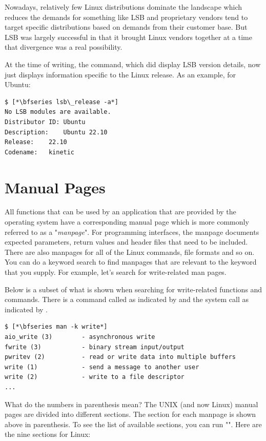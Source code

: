 Nowadays, relatively few Linux distributions dominate the landscape which reduces the demands for something like LSB and proprietary vendors tend to target specific distributions based on demands from their customer base. But LSB was largely successful in that it brought Linux vendors together at a time that divergence was a real possibility.

At the time of writing, the  command, which did display LSB version details, now just displays information specific to the Linux release. As an example, for Ubuntu:

\begin{lstlisting}
$ [*\bfseries lsb\_release -a*]
No LSB modules are available.
Distributor ID:	Ubuntu
Description:	Ubuntu 22.10
Release:	22.10
Codename:	kinetic
\end{lstlisting}

\section{Manual Pages}

All functions that can be used by an application that are provided by the operating system have a corresponding manual page which is more commonly referred to as a "\textit{manpage}". For programming interfaces, the manpage documents expected parameters, return values and header files that need to be included. There are also manpages for all of the Linux commands, file formats and so on. You can do a keyword search to find manpages that are relevant to the keyword that you supply. For example, let's search for write-related man pages.

Below is a subset of what is shown when searching for write-related functions and commands. There is a command called  as indicated by  and the  system call as indicated by .

\begin{lstlisting}
$ [*\bfseries man -k write*]
aio_write (3)        - asynchronous write
fwrite (3)           - binary stream input/output
pwritev (2)          - read or write data into multiple buffers
write (1)            - send a message to another user
write (2)            - write to a file descriptor
...
\end{lstlisting}

\noindent
What do the numbers in parenthesis mean? The UNIX (and now Linux) manual pages are divided into different sections. The section for each manpage is shown above in parenthesis. To see the list of available sections, you can run "". Here are the nine sections for Linux:


